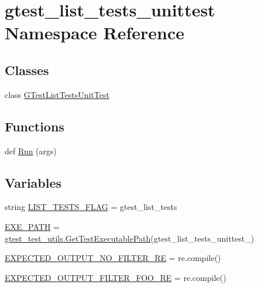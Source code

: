 \hypertarget{namespacegtest__list__tests__unittest}{}\section{gtest\+\_\+list\+\_\+tests\+\_\+unittest Namespace Reference}
\label{namespacegtest__list__tests__unittest}
\subsection*{Classes}
\begin{DoxyCompactItemize}
\item 
class \hyperlink{classgtest__list__tests__unittest_1_1_g_test_list_tests_unit_test}{G\+Test\+List\+Tests\+Unit\+Test}
\end{DoxyCompactItemize}
\subsection*{Functions}
\begin{DoxyCompactItemize}
\item 
def \hyperlink{namespacegtest__list__tests__unittest_ae820a362ba09ad61331e3f0c2a9f9cb6}{Run} (args)
\end{DoxyCompactItemize}
\subsection*{Variables}
\begin{DoxyCompactItemize}
\item 
string \hyperlink{namespacegtest__list__tests__unittest_a658d9ea18c57a13a25d0cce73d314e7a}{L\+I\+S\+T\+\_\+\+T\+E\+S\+T\+S\+\_\+\+F\+L\+AG} = \textquotesingle{}gtest\+\_\+list\+\_\+tests\textquotesingle{}
\item 
\hyperlink{namespacegtest__list__tests__unittest_ae58203009c92b993b4d1cabae4d5eb19}{E\+X\+E\+\_\+\+P\+A\+TH} = \hyperlink{namespacegtest__test__utils_a89ed3717984a80ffbb7a9c92f71b86a2}{gtest\+\_\+test\+\_\+utils.\+Get\+Test\+Executable\+Path}(\textquotesingle{}gtest\+\_\+list\+\_\+tests\+\_\+unittest\+\_\+\textquotesingle{})
\item 
\hyperlink{namespacegtest__list__tests__unittest_a29efbf77d2682ce359327e2e7dbd1c46}{E\+X\+P\+E\+C\+T\+E\+D\+\_\+\+O\+U\+T\+P\+U\+T\+\_\+\+N\+O\+\_\+\+F\+I\+L\+T\+E\+R\+\_\+\+RE} = re.\+compile()
\item 
\hyperlink{namespacegtest__list__tests__unittest_a1a20fef56cfe698649d63bc0c2b40229}{E\+X\+P\+E\+C\+T\+E\+D\+\_\+\+O\+U\+T\+P\+U\+T\+\_\+\+F\+I\+L\+T\+E\+R\+\_\+\+F\+O\+O\+\_\+\+RE} = re.\+compile()
\end{DoxyCompactItemize}


